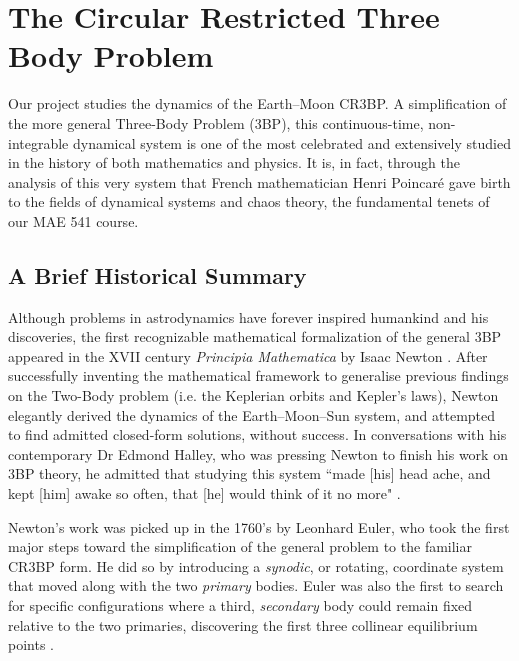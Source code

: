 \section{The Circular Restricted Three Body Problem} 
\label{sec:CR3BP}

Our project studies the dynamics of the Earth--Moon CR3BP. A simplification of the more general Three-Body Problem (3BP), this continuous-time, non-integrable dynamical system is one of the most celebrated and extensively studied in the history of both mathematics and physics. It is, in fact, through the analysis of this very system that French mathematician Henri Poincaré gave birth to the fields of dynamical systems and chaos theory, the fundamental tenets of our MAE 541 course.

\subsection{A Brief Historical Summary} \label{subsec:history}

Although problems in astrodynamics have forever inspired humankind and his discoveries, the first recognizable mathematical formalization of the general 3BP appeared in the XVII century \emph{Principia Mathematica} by Isaac Newton \cite{newton1687principia}. After successfully inventing the mathematical framework to generalise previous findings on the Two-Body problem (i.e. the Keplerian orbits and Kepler's laws), Newton elegantly derived the dynamics of the Earth--Moon--Sun system, and attempted to find admitted closed-form solutions, without success. In conversations with his contemporary Dr Edmond Halley, who was pressing Newton to finish his work on 3BP theory, he admitted that studying this system ``made [his] head ache, and kept [him] awake so often, that [he] would think of it no more" \cite{brewster1855memoirs}.

Newton's work was picked up in the 1760's by Leonhard Euler, who took the first major steps toward the simplification of the general problem to the familiar CR3BP form. He did so by introducing a \emph{synodic}, or rotating, coordinate system that moved along with the two \emph{primary} bodies. Euler was also the first to search for specific configurations where a third, \emph{secondary} body could remain fixed relative to the two primaries, discovering the first three collinear equilibrium points \cite{euler1767motu}.

